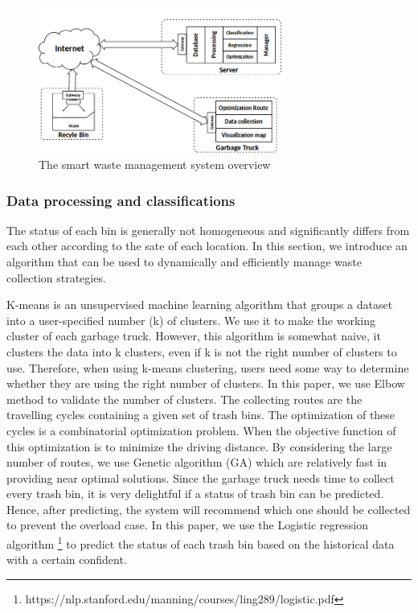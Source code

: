 \documentclass[conference,compsoc]{IEEEtran}
\begin{document}
\begin{figure}
	\centering
	\includegraphics[width=8cm]{Model1-2}
	\caption{The smart waste management system overview}
	\label{fig2}
\end{figure}




\subsubsection{Data processing and classifications}
The status of each bin is generally not homogeneous and significantly differs from each other according to the sate of each location. In this section, we introduce an algorithm that can be used to dynamically and efficiently manage waste collection strategies.
\par K-means \cite{Kanungo2003} is an unsupervised machine learning algorithm that groups a dataset into a user-specified number (k) of clusters. We use it to make the working cluster of each garbage truck. However, this algorithm is somewhat naive, it clusters the data into k clusters, even if k is not the right number of clusters to use. Therefore, when using k-means clustering, users need some way to determine whether they are using the right number of clusters. In this paper, we use Elbow method \cite{Kodinariya2013} to validate the number of clusters. The collecting routes are the travelling cycles containing a given set of trash bins. The optimization of these cycles is a combinatorial optimization problem. When the objective function of this optimization is to minimize the driving distance. By considering the large number of routes, we use Genetic algorithm (GA) \cite{Gutierrez2008} which are relatively fast in providing near optimal solutions. Since the garbage truck needs time to collect every trash bin, it is very delightful if a status of trash bin can be predicted. Hence, after predicting, the system will recommend which one should be collected to prevent the overload case. In this paper, we use the Logistic regression algorithm \footnote{https://nlp.stanford.edu/manning/courses/ling289/logistic.pdf} to predict the status of each trash bin based on the historical data with a certain confident.
\end{document}
